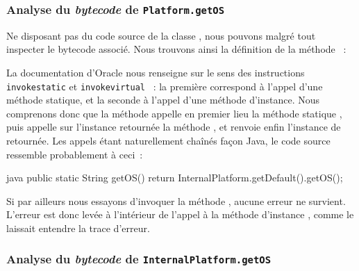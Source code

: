 \subsubsection{Analyse du \textit{bytecode} de \texttt{Platform.getOS}}

Ne disposant pas du code source de la classe , nous pouvons malgré tout inspecter le bytecode associé.
Nous trouvons ainsi la définition de la méthode ~:


La documentation d'Oracle nous renseigne sur le sens des instructions \texttt{invokestatic} \cite{javainvokestatic} et \texttt{invokevirtual} \cite{javainvokevirtual}~: %
la première correspond à l'appel d'une méthode statique, et la seconde à l'appel d'une méthode d'instance.
Nous comprenons donc que la méthode  appelle en premier lieu la méthode statique , %
puis appelle sur l'instance retournée la méthode , et renvoie enfin l'instance de  retournée.
Les appels étant naturellement chaînés façon Java, le code source ressemble probablement à ceci~:

\begin{imtaCode}{java}
public static String getOS() {
    return InternalPlatform.getDefault().getOS();
}
\end{imtaCode}

Si par ailleurs nous essayons d'invoquer la méthode , aucune erreur ne survient.
L'erreur est donc levée à l'intérieur de l'appel à la méthode d'instance , comme le laissait entendre la trace d'erreur.


\subsubsection{Analyse du \textit{bytecode} de \texttt{InternalPlatform.getOS}}

